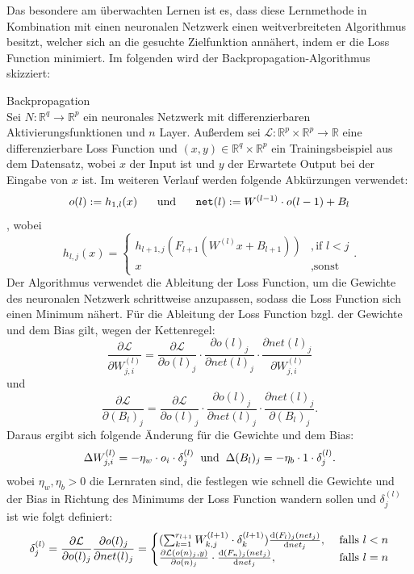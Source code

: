 \documentclass[12pt,letterpaper,ngerman]{article}
\begin{document}
\pagebreak
Das besondere am überwachten Lernen ist es, dass diese 
Lernmethode in Kombination mit einen neuronalen Netzwerk
einen weitverbreiteten Algorithmus besitzt, welcher
sich an die gesuchte Zielfunktion annähert,
indem er die Loss Function minimiert. Im folgenden 
wird der Backpropagation-Algorithmus skizziert:
\begin{definition}{Backpropagation}
  \\
  Sei $N: \mathbb{R}^q \to \mathbb{R}^p$ ein neuronales Netzwerk 
  mit differenzierbaren Aktivierungsfunktionen und $n$ Layer.
  Außerdem sei
  $\mathcal{L}: \mathbb{R}^p \times \mathbb{R}^p \to \mathbb{R}$
  eine differenzierbare Loss Function und
  $(x,y)\in \mathbb{R}^q \times \mathbb{R}^p $ ein Trainingsbeispiel
  aus dem Datensatz, wobei $x$ der Input ist und $y$ der Erwartete
  Output bei der Eingabe von $x$ ist.
  Im weiteren Verlauf werden folgende Abkürzungen verwendet:
  \[
    o(l) := h_{1,l}(x) \hspace{0.5cm}\text{ und } \hspace{0.5cm}
    \texttt{net}(l) := W^{(l-1)}\cdot o(l-1) + B_l
  \],
  wobei
  \[
    h_{l,j}(x) = 
      \begin{cases}
        h_{l+1,j}(F_{l+1}(W^{(l)}x + B_{l+1}))& ,  \text{if } l < j  \\
        x & , \text{sonst}
      \end{cases}.
  \]
  Der Algorithmus verwendet die Ableitung der Loss Function, um
  die Gewichte des neuronalen Netzwerk schrittweise anzupassen,
  sodass die Loss Function sich einen Minimum nähert. Für die 
  Ableitung der Loss Function bzgl. der Gewichte und dem Bias 
  gilt, wegen der Kettenregel:
    \[
      \frac{\partial \mathcal{L}}{\partial W_{j,i}^{(l)}} = 
      \frac{\partial \mathcal{L}}{\partial o(l)_j} \cdot
        \frac{\partial o(l)_j}{\partial net(l)_j} \cdot
        \frac{\partial net(l)_j}{\partial W_{j,i}^{(l)}}
    \]
    und 
    \[
      \frac{\partial \mathcal{L}}{\partial (B_l)_j} = 
      \frac{\partial \mathcal{L}}{\partial o(l)_j} \cdot
        \frac{\partial o(l)_j}{\partial net(l)_j} \cdot
        \frac{\partial net(l)_j}{\partial (B_l)_{j}}.
    \]
    Daraus ergibt sich folgende Änderung für die Gewichte 
    und dem Bias:
    \[ \Delta W_{j,i}^{(l)} = -\eta_w \cdot o_i  \cdot \delta_j^{(l)}
      \hspace{0.2cm}
      \text{und}
      \hspace{0.2cm}
     \Delta (B_l)_j = -\eta_b \cdot 1 \cdot \delta_j^{(l)}. \]
    wobei $\eta_w, \eta_b > 0$ die Lernraten sind, die festlegen
    wie schnell die Gewichte und der Bias in Richtung des Minimums
    der Loss Function wandern sollen und $\delta_{j}^{(l)}$ ist
    wie folgt definiert:
    \[
      \delta_j^{(l)} = 
        \frac{\partial \mathcal{L}}{\partial o(l)_j}
        \frac{\partial o(l)_j}{\partial net(l)_j}
        =
        \begin{cases}
          (\sum_{k=1}^{r_{l+1}} W^{(l+1)}_{k,j}\cdot \delta_k^{(l+1)}) 
          \dv{(F_l)_j(net_j)}{net_j},& \text{ falls } l < n  \\
          \frac{\partial \mathcal{L}(o(n)_j, y)}{\partial o(n)_j}
          \cdot 
          \dv{(F_n)_j(net_j)}{net_j}
          ,& \text{ falls } l = n
        

\end{cases}\]
\end{definition}
\end{document}
